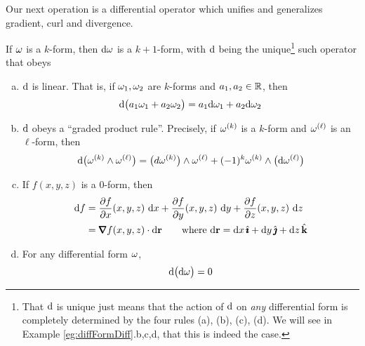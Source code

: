 Our next operation is a differential operator which unifies and generalizes
gradient, curl and divergence.

\begin{defn}
             \label{def:differentialFormDiff}
If $\omega$ is a $k$-form, then $\mathrm{d}\omega$ is a $k+1$-form, with
$\mathrm{d}$ being the unique\footnote{That $\mathrm{d}$ is unique just means that
the action of $\mathrm{d}$ on \emph{any} differential form is completely 
determined by the four rules (a), (b), (c), (d). We will see in 
Example \ref{eg:diffFormDiff}.b,c,d, that this is indeed the case.} 
such operator that obeys
\begin{enumerate}[(a)]
\item
$\mathrm{d}$ is linear. That is, if $\omega_1,\omega_2$ are $k$-forms and 
$a_1,a_2\in\mathbb{R}$, then 
\begin{equation*}
\mathrm{d}\big(a_1\omega_1+a_2\omega_2\big)
=a_1\mathrm{d}\omega_1+a_2\mathrm{d}\omega_2
\end{equation*}

\item
$\mathrm{d}$ obeys a ``graded product rule''. Precisely, if $\omega^{(k)}$ is a 
$k$-form and $\omega^{(\ell)}$ is an $\ell$-form, then 
\begin{equation*}
\mathrm{d}\big(\omega^{(k)}\wedge\omega^{(\ell)}\big)
=\big(d\omega^{(k)}\big)\wedge\omega^{(\ell)}
+(-1)^k\omega^{(k)} \wedge \big(\mathrm{d}\omega^{(\ell)}\big)
\end{equation*}

\item
If $f(x,y,z)$ is a $0$-form, then
\begin{align*}
\dee{f}
&=\frac{\partial f}{\partial x}(x,y,z)\ \dee{x}
+\frac{\partial f}{\partial y}(x,y,z)\ \dee{y}
+\frac{\partial f}{\partial z}(x,y,z)\ \dee{z} \\
&=\vnabla f(x,y,z)\cdot\dee{\vr}
\qquad\text{where }
\dee{\vr} = \dee{x}\,\hi + \dee{y}\,\hj + \dee{z}\,\hk
\end{align*}

\item
For any differential form $\omega$, 
\begin{equation*}
\mathrm{d}\big(\mathrm{d}\omega\big)=0
\end{equation*}
\end{enumerate}
\end{defn}

